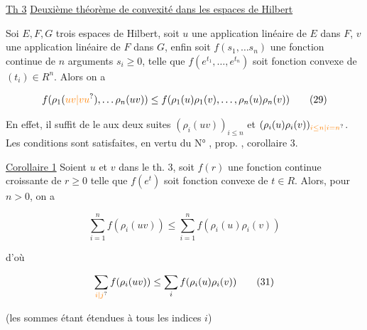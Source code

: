 \uline{Th 3} \uline{Deuxième théorème de convexité dans les espaces de Hilbert}

Soi $E,F,G$ trois espaces de Hilbert, soit $u$ une application linéaire  de $E$ dans $F$,  $v$ une application linéaire  de $F$ dans $G$,  enfin soit $f(s_1,\ldots s_n)$ une fonction continue  de $n$ arguments $s_i\geq0$, telle que  $f(e^{t_1},\ldots,e^{t_n})$ soit fonction convexe de $(t_i)\in R^n$. Alors on a

\[
f(\rho_1(\unsure{uv|vu}),\ldots\rho_n(uv))\leq f(\rho_1(u)\rho_1(v),\ldots,\rho_n(u)\rho_n(v))\tag*{(29)}
\]

En effet, il suffit de  le   aux deux suites $(\rho_i(uv))_{i\leq n}$ et $(\rho_i(u)\rho_i(v))_{\unsure{i\leq n|i=n}}$. Les conditions  sont satisfaites,  en vertu du N° , prop. , corollaire 3. 

\uline{Corollaire 1} Soient $u$ et $v$  dans le th. 3, soit $f(r)$ une fonction continue croissante de $r\geq0$ telle que $f(e^t)$ soit fonction convexe de $t\in R$. Alors, pour  $n>0$, on a

\[
\sum_{i=1}^n f(\rho_i(uv))\leq\sum_{i=1}^n f(\rho_i(u)\rho_i(v))\tag*{(30)}
\]

 d'où

\[
\sum_{\unsure{i|j}} f(\rho_i(uv))\leq\sum_i f(\rho_i(u)\rho_i(v))\tag*{(31)}
\]

(les sommes étant étendues à tous les indices $i$)



